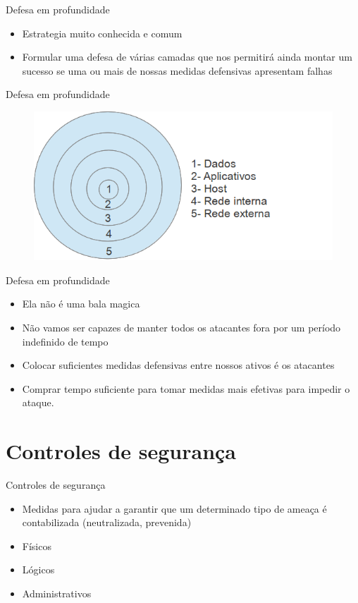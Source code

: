 \documentclass{beamer}
\begin{document}
\begin{frame}{Defesa em profundidade}
\begin{itemize}
\item Estrategia muito conhecida e comum
\item Formular uma defesa de várias camadas que nos permitirá ainda montar um sucesso se uma ou mais de nossas medidas defensivas apresentam falhas
\end{itemize}
\end{frame}

\begin{frame}{Defesa em profundidade}
\begin{figure}[tbph]
\centering
\includegraphics[width=0.7\linewidth]{./capas}
\label{fig:capas}
\end{figure}
\end{frame}

\begin{frame}{Defesa em profundidade}
\begin{itemize}
\item Ela não é uma bala magica
\item Não vamos ser capazes de manter todos os atacantes fora por um período indefinido de tempo
\item Colocar suficientes medidas defensivas entre nossos ativos é os atacantes
\item Comprar tempo suficiente para tomar medidas mais efetivas para impedir o ataque.
\end{itemize}
\end{frame}

\section{Controles de segurança}
\begin{frame}{Controles de segurança}
\begin{itemize}
\item Medidas para ajudar a garantir que um determinado tipo de ameaça é contabilizada (neutralizada, prevenida)
\item Físicos
\item Lógicos
\item Administrativos
\end{itemize}
\end{frame}
\end{document}
